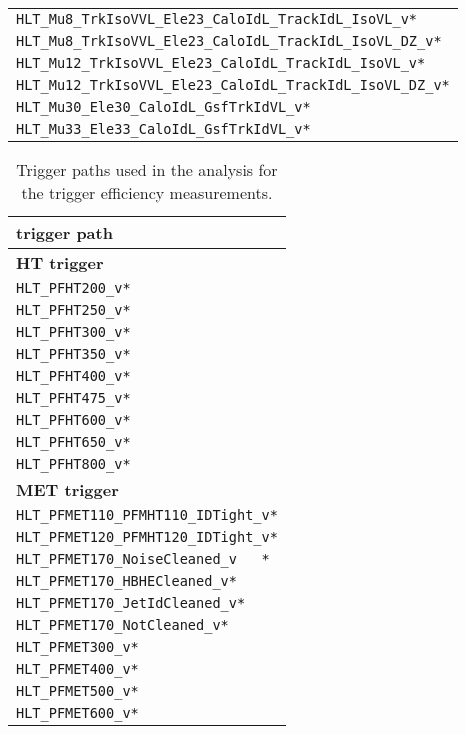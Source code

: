 \begin{table}[htb]
\begin{tabular}[width=\textwidth]{l}
  \verb|HLT_Mu8_TrkIsoVVL_Ele23_CaloIdL_TrackIdL_IsoVL_v*|                     \\
  \verb|HLT_Mu8_TrkIsoVVL_Ele23_CaloIdL_TrackIdL_IsoVL_DZ_v*|                     \\
  \verb|HLT_Mu12_TrkIsoVVL_Ele23_CaloIdL_TrackIdL_IsoVL_v*|                     \\
  \verb|HLT_Mu12_TrkIsoVVL_Ele23_CaloIdL_TrackIdL_IsoVL_DZ_v*|                     \\
  \verb|HLT_Mu30_Ele30_CaloIdL_GsfTrkIdVL_v*|                     \\
  \verb|HLT_Mu33_Ele33_CaloIdL_GsfTrkIdVL_v*|                     \\
  \hline
 \end{tabular}
\end{table}




\begin{table}[htb]
 \centering
 \caption{Trigger paths used in the analysis for the trigger efficiency measurements.}
 \normalsize
 \label{tab:app_trigger2}
 \begin{tabular}[width=\textwidth]{l}
  \hline
  \normalsize{trigger path}         \\\hline
  \normalsize{\textbf{HT trigger}}  \\
  \verb|HLT_PFHT200_v*|           \\
  \verb|HLT_PFHT250_v*|           \\
  \verb|HLT_PFHT300_v*|           \\
  \verb|HLT_PFHT350_v*|           \\
  \verb|HLT_PFHT400_v*|           \\
  \verb|HLT_PFHT475_v*|           \\
  \verb|HLT_PFHT600_v*|           \\
  \verb|HLT_PFHT650_v*|           \\
  \verb|HLT_PFHT800_v*|           \\
  \normalsize{\textbf{MET trigger}} \\
  \verb|HLT_PFMET110_PFMHT110_IDTight_v*|           \\
  \verb|HLT_PFMET120_PFMHT120_IDTight_v*|           \\
  \verb|HLT_PFMET170_NoiseCleaned_v   *|           \\
  \verb|HLT_PFMET170_HBHECleaned_v*|           \\
  \verb|HLT_PFMET170_JetIdCleaned_v*|           \\
  \verb|HLT_PFMET170_NotCleaned_v*|           \\
  \verb|HLT_PFMET300_v*|           \\
  \verb|HLT_PFMET400_v*|           \\
  \verb|HLT_PFMET500_v*|           \\
  \verb|HLT_PFMET600_v*|           \\
  \hline
 \end{tabular}
\end{table}
